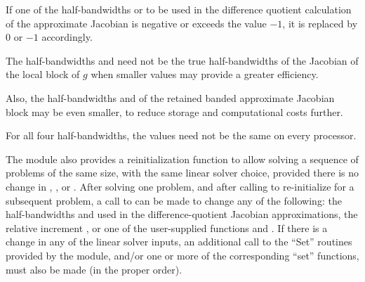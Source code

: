 {
  If one of the half-bandwidths  or  to be used in the
  difference quotient calculation of the approximate Jacobian is negative or
  exceeds the value $-1$, it is replaced by 0 or
  $-1$ accordingly.

  The half-bandwidths  and  need not be the true
  half-bandwidths of the Jacobian of the local block of $g$
  when smaller values may provide a greater efficiency.

  Also, the half-bandwidths  and  of the retained
  banded approximate Jacobian block may be even smaller,
  to reduce storage and computational costs further.

  For all four half-bandwidths, the values need not be the
  same on every processor.
}


The {\cvbbdpre} module also provides a reinitialization function to allow
solving a sequence of problems of the same size, with the same linear solver
choice, provided there is no change in , , or .
After solving one problem, and after calling  to
re-initialize {\cvode} for a subsequent problem, a call to 
can be made to change any of the following: the half-bandwidths  and
 used in the difference-quotient Jacobian approximations, the relative
increment , or one of the user-supplied functions  and .
If there is a change in any of the linear solver inputs, an additional call
to the ``Set'' routines provided by the {\sunlinsol} module, and/or
one or more of the corresponding {\cvls} ``set'' functions, must
also be made (in the proper order).

